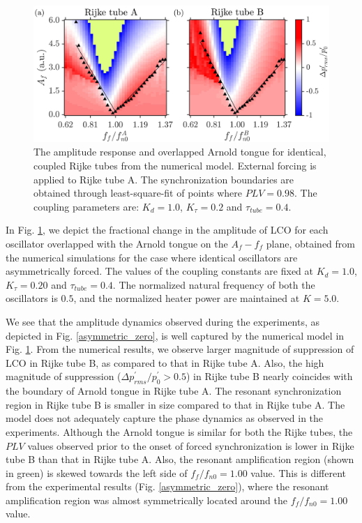\documentclass[%
preprint,
 amsmath,amssymb,
 aps,
 pra,
]{revtex4-2}
\begin{document}
\begin{figure}[t!]
\centering
\includegraphics[scale=0.21]{fig11.jpg}
\caption{\label{coupled_identical}The amplitude response and overlapped Arnold tongue for identical, coupled Rijke tubes from the numerical model. External forcing is applied to Rijke tube A. The synchronization boundaries are obtained through least-square-fit of points where $PLV=0.98$. The coupling parameters are: $K_d = 1.0$, $K_{\tau} = 0.2$ and $\tau_{tube} = 0.4$.}
\end{figure}

In Fig. \ref{coupled_identical}, we depict the fractional change in the amplitude of LCO for each oscillator overlapped with the Arnold tongue on the $A_f - f_f$ plane, obtained from the numerical simulations for the case where identical oscillators are asymmetrically forced. The values of the coupling constants are fixed at $K_d = 1.0$, $K_{\tau} = 0.20$ and $\tau_{tube} = 0.4$. The normalized natural frequency of both the oscillators is $0.5$, and the normalized heater power are maintained at $K=5.0$. 

We see that the amplitude dynamics observed during the experiments, as depicted in Fig. \ref{asymmetric_zero}, is well captured by the numerical model in Fig. \ref{coupled_identical}. From the numerical results, we observe larger magnitude of suppression of LCO in Rijke tube B, as compared to that in Rijke tube A. Also, the high magnitude of suppression ($\Delta p^\prime_{rms}/p^\prime_{0}>0.5$) in Rijke tube B nearly coincides with the boundary of Arnold tongue in Rijke tube A. The resonant synchronization region in Rijke tube B is smaller in size compared to that in Rijke tube A. The model does not adequately capture the phase dynamics as observed in the experiments. Although the Arnold tongue is similar for both the Rijke tubes, the $PLV$ values observed prior to the onset of forced synchronization is lower in Rijke tube B than that in Rijke tube A. Also, the resonant amplification region (shown in green) is skewed towards the left side of $f_f/f_{n0} = 1.00$ value. This is different from the experimental results (Fig. \ref{asymmetric_zero}), where the resonant amplification region was almost symmetrically located around the $f_f/f_{n0} = 1.00$ value.
\end{document}
